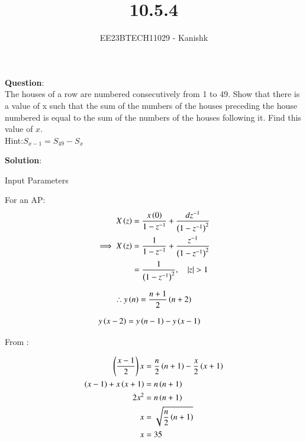 \documentclass[journal,12pt,onecolumn]{IEEEtran}
\theoremstyle{remark}
\begin{document}

\vspace{3cm}

\title{10.5.4}
\author{EE23BTECH11029 - Kanishk}
\maketitle

\bigskip

\renewcommand{\thefigure}{\theenumi}
\renewcommand{\thetable}{\theenumi}
\textbf{Question}:\\
The houses of a row are numbered consecutively from 1 to 49. Show that there is a value
of x such that the sum of the numbers of the houses preceding the house numbered is equal to the sum of the numbers of the houses following it. Find this value of $x$.\\
Hint:$ S_{x-1}=S_{49}-S_x$

\textbf{Solution}:\\

\begin{table}[ht]
    \centering
    \def\arraystretch{2.5}
    
   \caption{Input Parameters}
   \label{tab:10.5.4}
\end{table}

For an AP: 
\begin{align}
X\left(z\right)&=\frac{x\left(0\right)}{1-z^{-1}}+ \frac{dz^{-1}}{\left(1-z^{-1}\right)^{2}}\\
\implies X\left(z\right)&=\frac{1}{1-z^{-1}}+ \frac{z^{-1}}{\left(1-z^{-1}\right)^{2}}\\
&=\frac{1}{\left(1-z^{-1}\right)^{2}},\quad \left\vert z\right\vert > 1
\end{align}

\begin{align}
    \therefore y\left(n\right)=\frac{n+1}{2}\left(n+2\right)
\end{align}

\begin{align}
y\left(x-2\right)&=y\left(n-1\right)-y\left(x-1\right)
\end{align}

\newpage
From :

\begin{align}
\left(\frac{x-1}{2}\right)x&=\frac{n}{2}\left(n+1\right)-\frac{x}{2}\left(x+1\right)\\
\left(x-1\right)+x\left(x+1\right)&=n\left(n+1\right)\\
2x^{2}&=n\left(n+1\right)\\
x&=\sqrt{\frac{n}{2}\left(n+1\right)}\\
x&=35
\end{align}
\end{document}
